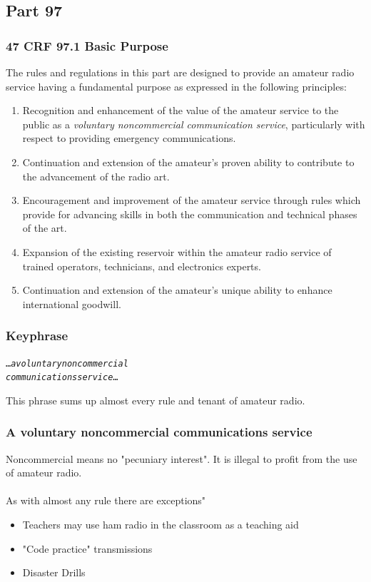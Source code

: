 \documentclass[12pt]{beamer}
\begin{document}
\subsection{Part 97}

\begin{frame}
\frametitle{47 CRF 97.1 Basic Purpose}
The rules and regulations in this part are designed to provide an amateur radio service having a fundamental purpose as expressed in the following principles:
\begin{enumerate}[A]
\scriptsize\item  Recognition and enhancement of the value of the amateur service to the public as a \emph{voluntary noncommercial communication service}, particularly with respect to providing emergency communications.\pause
\item Continuation and extension of the amateur's proven ability to contribute to the advancement of the radio art.\pause
\item Encouragement and improvement of the amateur service through rules which provide for advancing skills in both the communication and technical phases of the art.\pause
\item  Expansion of the existing reservoir within the amateur radio service of trained operators, technicians, and electronics experts. \pause
\item Continuation and extension of the amateur's unique ability to enhance international goodwill.
\end{enumerate}
\end{frame}

\begin{frame}
\frametitle{Keyphrase}
\begin{alltt}
\ldots\emph{a voluntary noncommercial\\communications service}\ldots
\end{alltt}
This phrase sums up almost every rule and tenant of amateur radio.
\end{frame}

\begin{frame}
\frametitle{A voluntary noncommercial communications service}
Noncommercial means no "pecuniary interest". It is illegal to profit from the use of amateur radio.\\
\hfil \\As with almost any rule there are exceptions"
\begin{itemize}
\item Teachers may use ham radio in the classroom as a teaching aid
\item "Code practice" transmissions
\item Disaster Drills
\end{itemize}
\end{frame}
\end{document}
